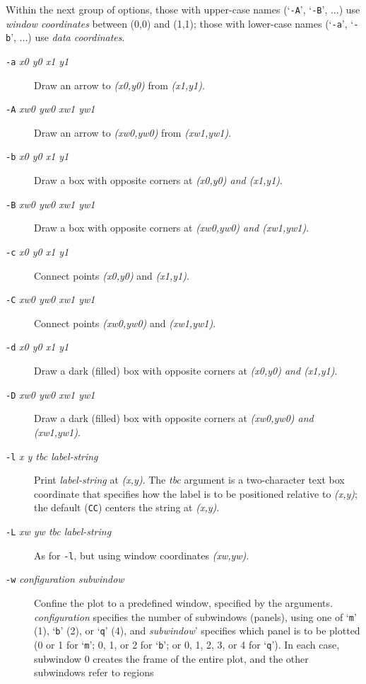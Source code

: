 Within the next group of options,
those with upper-case names (`\texttt{-A}', `\texttt{-B}', ...) use \textit{window coordinates} between (0,0)
and (1,1); those with lower-case names (`\texttt{-a}', `\texttt{-b}', ...) use \textit{data coordinates}. \begin{description}
\item [\texttt{-a}\textit{ x0
y0 x1 y1} ] Draw an arrow to \textit{(x0,y0)} from \textit{(x1,y1)}. 
\item [\texttt{-A}\textit{ xw0 yw0 xw1 yw1} ] Draw an
arrow to \textit{(xw0,yw0)} from \textit{(xw1,yw1)}. 
\item [\texttt{-b}\textit{ x0 y0 x1 y1} ] Draw a box with opposite
corners at \textit{(x0,y0) and \textit{(x1,y1)}}. 
\item [\texttt{-B}\textit{ xw0 yw0 xw1 yw1} ] Draw a box with opposite
corners at \textit{(xw0,yw0) and \textit{(xw1,yw1)}}. 
\item [\texttt{-c}\textit{ x0 y0 x1 y1} ] Connect points \textit{(x0,y0)}
and \textit{(x1,y1)}. 
\item [\texttt{-C}\textit{ xw0 yw0 xw1 yw1} ] Connect points \textit{(xw0,yw0)} and \textit{(xw1,yw1)}. 
\item [\texttt{-d}\textit{
x0 y0 x1 y1} ] Draw a dark (filled) box with opposite corners at \textit{(x0,y0) and
\textit{(x1,y1)}}. 
\item [\texttt{-D}\textit{ xw0 yw0 xw1 yw1} ] Draw a dark (filled) box with opposite corners
at \textit{(xw0,yw0) and \textit{(xw1,yw1)}}. 
\item [\texttt{-l}\textit{ x y tbc label-string} ] Print \textit{label-string} at \textit{(x,y)}.
 The \textit{tbc} argument is a two-character text box coordinate that specifies
how the label is to be positioned relative to \textit{(x,y)};  the default (\texttt{CC})
centers the string at \textit{(x,y)}. 
\item [\texttt{-L}\textit{ xw yw tbc label-string} ] As for \texttt{-l}, but using
window coordinates \textit{(xw,yw)}. 
\item [\texttt{-w}\textit{ configuration subwindow} ] Confine the plot to
a predefined window, specified by the arguments. \textit{configuration} specifies
the number of subwindows (panels), using one of `\texttt{m}' (1), `\texttt{b}' (2), or `\texttt{q}' (4),
and \textit{subwindow}' specifies which panel is to be plotted (0 or 1 for `\texttt{m}'; 0,
1, or 2 for `\texttt{b}'; or 0, 1, 2, 3, or 4 for `\texttt{q}').  In each case, subwindow 0 creates
the frame of the entire plot, and the other subwindows refer to regions

\end{description}
